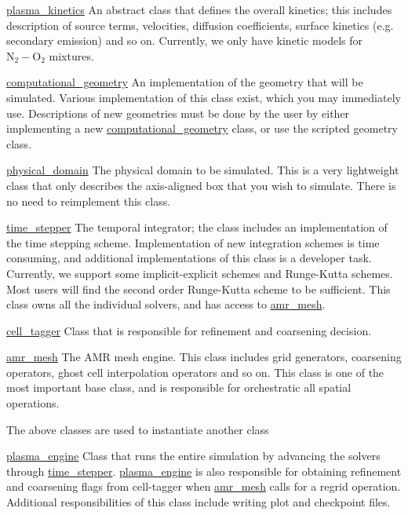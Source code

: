 \begin{DoxyItemize}
\item \hyperlink{classplasma__kinetics}{plasma\+\_\+kinetics} An abstract class that defines the overall kinetics; this includes description of source terms, velocities, diffusion coefficients, surface kinetics (e.\+g. secondary emission) and so on. Currently, we only have kinetic models for $\textrm{N}_2-\textrm{O}_2$ mixtures.
\item \hyperlink{classcomputational__geometry}{computational\+\_\+geometry} An implementation of the geometry that will be simulated. Various implementation of this class exist, which you may immediately use. Descriptions of new geometries must be done by the user by either implementing a new \hyperlink{classcomputational__geometry}{computational\+\_\+geometry} class, or use the scripted geometry class.
\item \hyperlink{classphysical__domain}{physical\+\_\+domain} The physical domain to be simulated. This is a very lightweight class that only describes the axis-\/aligned box that you wish to simulate. There is no need to reimplement this class.
\item \hyperlink{classtime__stepper}{time\+\_\+stepper} The temporal integrator; the class includes an implementation of the time stepping scheme. Implementation of new integration schemes is time consuming, and additional implementations of this class is a developer task. Currently, we support some implicit-\/explicit schemes and Runge-\/\+Kutta schemes. Most users will find the second order Runge-\/\+Kutta scheme to be sufficient. This class owns all the individual solvers, and has access to \hyperlink{classamr__mesh}{amr\+\_\+mesh}.
\item \hyperlink{classcell__tagger}{cell\+\_\+tagger} Class that is responsible for refinement and coarsening decision.
\item \hyperlink{classamr__mesh}{amr\+\_\+mesh} The A\+MR mesh engine. This class includes grid generators, coarsening operators, ghost cell interpolation operators and so on. This class is one of the most important base class, and is responsible for orchestratic all spatial operations.
\end{DoxyItemize}

The above classes are used to instantiate another class


\begin{DoxyItemize}
\item \hyperlink{classplasma__engine}{plasma\+\_\+engine} Class that runs the entire simulation by advancing the solvers through \hyperlink{classtime__stepper}{time\+\_\+stepper}. \hyperlink{classplasma__engine}{plasma\+\_\+engine} is also responsible for obtaining refinement and coarsening flags from cell-\/tagger when \hyperlink{classamr__mesh}{amr\+\_\+mesh} calls for a regrid operation. Additional responsibilities of this class include writing plot and checkpoint files.
\end{DoxyItemize}

